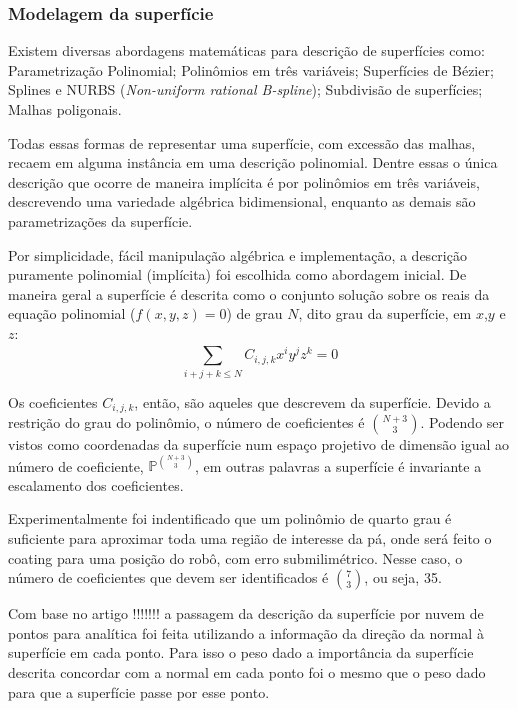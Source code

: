 \subsubsection{Modelagem da superfície}\label{modelagem}

%





Existem diversas abordagens matemáticas para descrição de superfícies como:
Parametrização Polinomial; Polinômios em três variáveis; Superfícies de
Bézier; Splines e NURBS (\textit{Non-uniform rational B-spline}); Subdivisão de
superfícies; Malhas poligonais.

Todas essas formas de representar uma superfície, com excessão das malhas,
recaem em alguma instância em uma descrição polinomial. Dentre essas o única
descrição que ocorre de maneira implícita é por polinômios em três variáveis,
descrevendo uma variedade algébrica bidimensional, enquanto as demais são
parametrizações da superfície. 

Por simplicidade, fácil manipulação algébrica e implementação, a descrição
puramente polinomial (implícita) foi escolhida como abordagem inicial. De
maneira geral a superfície é descrita como o conjunto solução sobre os
reais da equação polinomial ($f(x,y,z)=0$) de grau $N$, dito grau da
superfície, em $x$,$y$ e $z$:
\[\sum\limits_{i+j+k \leq N}^{} C_{i,j,k}x^iy^jz^k = 0\]

Os coeficientes $C_{i,j,k}$, então, são aqueles que descrevem da superfície.
Devido a restrição do grau do polinômio, o número de coeficientes é
$\binom{N+3}{3}$. Podendo ser vistos como coordenadas da superfície num espaço
projetivo de dimensão igual ao número de coeficiente,
$\mathbb{P}^{\binom{N+3}{3}}$, em outras palavras a superfície é invariante a
escalamento dos coeficientes.

Experimentalmente foi indentificado que um polinômio de quarto grau é suficiente
para aproximar toda uma região de interesse da pá, onde será feito o coating
para uma posição do robô, com erro submilimétrico. Nesse caso, o número de
coeficientes que devem ser identificados é $\binom{7}{3}$, ou seja, 35.

Com base no artigo !!!!!!! a passagem da descrição da superfície por nuvem de
pontos para analítica foi feita utilizando a informação da direção da normal à
superfície em cada ponto. Para isso o peso dado a importância da superfície
descrita concordar com a normal em cada ponto foi o mesmo que o peso dado para
que a superfície passe por esse ponto.

